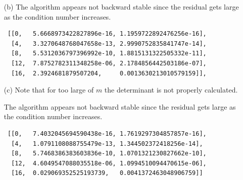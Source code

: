 \documentclass[10pt]{article}
\begin{document}
\begin{solution}[Solution]
\begin{enumerate}
    \item[(b)] The algorithm appears not backward stable since the residual gets large as the condition number increases.

    \begin{lstlisting}
 [[0,   5.6668973422827896e-16, 1.1959722892476256e-16],
  [4,   3.3270648768047658e-13, 2.9990752835841747e-14],
  [8,   5.5312036797396992e-10, 1.8815131322505332e-11],
  [12,  7.8752782311348258e-06, 2.1784856442503186e-07],
  [16,  2.3924681879507204,     0.0013630213010579159]],
    \end{lstlisting}


    \item[(c)] Note that for too large of \( m \) the determinant is not properly calculated.

 The algorithm appears not backward stable since the residual gets large as the condition number increases.
        
        \begin{lstlisting}
 [[0,   7.4032045694590438e-16, 1.7619297304857857e-16],
  [4,   1.0791108088755479e-13, 1.344502372418256e-14],
  [8,   5.7468386383603836e-10, 1.0701321230827662e-10],
  [12,  4.6049547088035518e-06, 1.0994510094470615e-06],
  [16,  0.029069352525193739,   0.0041372463048906759]]
        \end{lstlisting}
\end{enumerate}
\end{solution}
\end{document}
